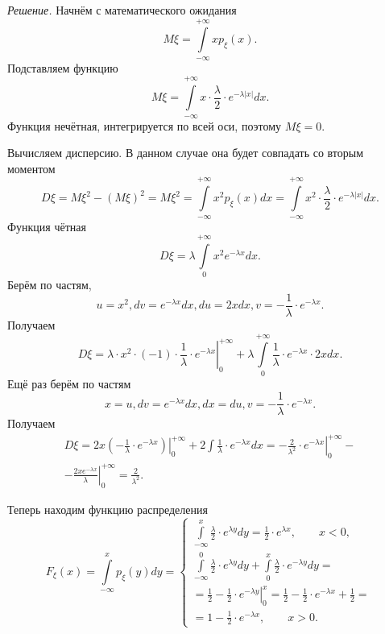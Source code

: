 \textit{Решение.} Начнём с математического ожидания
$$M \xi =
\int \limits_{- \infty }^{+ \infty }xp_{ \xi } \left( x \right).$$
Подставляем функцию
$$M \xi =
\int \limits_{- \infty }^{+ \infty } x \cdot \frac{ \lambda }{2} \cdot e^{- \lambda \left| x \right| } dx.$$
Функция нечётная, интегрируется по всей оси, поэтому $M \xi = 0$.

Вычисляем дисперсию.
В данном случае она будет совпадать со вторым моментом
$$D \xi =
M \xi^2 - \left( M \xi \right)^2 =
M \xi^2 =
\int \limits_{- \infty }^{+ \infty } x^2 p_{ \xi } \left( x \right) dx =
\int \limits_{- \infty }^{+ \infty } x^2 \cdot \frac{ \lambda }{2} \cdot e^{- \lambda \left| x \right| } dx.$$
Функция чётная
$$D \xi =
\lambda \int \limits_0^{+ \infty } x^2 e^{- \lambda x} dx.$$
Берём по частям,
$$u = x^2,
dv = e^{- \lambda x} dx,
du = 2xdx,
v = - \frac{1}{ \lambda } \cdot e^{- \lambda x}.$$
Получаем
$$D \xi =
\left. \lambda \cdot x^2 \cdot \left( -1 \right) \cdot \frac{1}{ \lambda } \cdot e^{- \lambda x} \right|_0^{+ \infty } +
\lambda \int \limits_0^{+ \infty } \frac{1}{ \lambda } \cdot e^{- \lambda x} \cdot 2xdx.$$
Ещё раз берём по частям
$$x = u,
dv = e^{- \lambda x}dx,
dx = du,
v = - \frac{1}{ \lambda } \cdot e^{- \lambda x}.$$
Получаем
\begin{equation*}
  \begin{split}
    D \xi =
    \left.
      2x \left( - \frac{1}{ \lambda } \cdot e^{- \lambda x} \right)
    \right|_0^{+ \infty } +
    2 \int \frac{1}{ \lambda } \cdot e^{- \lambda x} dx =
    \left.
      -\frac{2}{ \lambda^2} \cdot e^{- \lambda x}
    \right|_0^{+ \infty } - \\
    -\left. \frac{2xe^{- \lambda x}}{ \lambda } \right|_0^{+ \infty } =
    \frac{2}{ \lambda^2}.
  \end{split}
\end{equation*}

Теперь находим функцию распределения
$$F_{ \xi } \left( x \right) =
  \int \limits_{- \infty }^{x} p_{ \xi } \left( y \right) dy =
  \begin{cases}
    \int \limits_{- \infty }^x \frac{ \lambda }{2} \cdot e^{ \lambda y} dy =
    \frac{1}{2} \cdot e^{ \lambda x}, \qquad x < 0, \\
    \int \limits_{- \infty }^0
      \frac{ \lambda }{2} \cdot e^{ \lambda y} dy +
    \int \limits_0^x \frac{ \lambda }{2} \cdot e^{- \lambda y} dy = \\
    = \left. \frac{1}{2} - \frac{1}{2} \cdot e^{- \lambda y} \right|_0^x =
    \frac{1}{2} - \frac{1}{2} \cdot e^{- \lambda x} + \frac{1}{2} = \\
    = 1 - \frac{1}{2} \cdot e^{- \lambda x}, \qquad x > 0.
  \end{cases}$$

